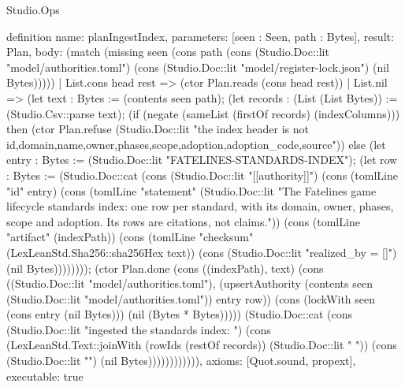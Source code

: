 \begin{lexlean}{Studio.Ops}
\begin{semanticmodule}
definition{
  name: planIngestIndex,
  parameters: [seen : Seen, path : Bytes],
  result: Plan,
  body: (match (missing seen (cons path (cons (Studio.Doc::lit "model/authorities.toml") (cons (Studio.Doc::lit "model/register-lock.json") (nil Bytes)))))
    | List.cons head rest => (ctor Plan.reads (cons head rest))
    | List.nil => (let text : Bytes := (contents seen path); (let records : (List (List Bytes)) := (Studio.Csv::parse text); (if (negate (sameList (firstOf records) (indexColumns))) then (ctor Plan.refuse (Studio.Doc::lit "the index header is not id,domain,name,owner,phases,scope,adoption,adoption_code,source\n")) else (let entry : Bytes := (Studio.Doc::lit "FATELINES-STANDARDS-INDEX"); (let row : Bytes := (Studio.Doc::cat (cons (Studio.Doc::lit "[[authority]]\n") (cons (tomlLine "id" entry) (cons (tomlLine "statement" (Studio.Doc::lit "The Fatelines game lifecycle standards index: one row per standard, with its domain, owner, phases, scope and adoption. Its rows are citations, not claims.")) (cons (tomlLine "artifact" (indexPath)) (cons (tomlLine "checksum" (LexLeanStd.Sha256::sha256Hex text)) (cons (Studio.Doc::lit "realized_by = []\n") (nil Bytes)))))))); (ctor Plan.done (cons ((indexPath), text) (cons ((Studio.Doc::lit "model/authorities.toml"), (upsertAuthority (contents seen (Studio.Doc::lit "model/authorities.toml")) entry row)) (cons (lockWith seen (cons entry (nil Bytes))) (nil (Bytes * Bytes))))) (Studio.Doc::cat (cons (Studio.Doc::lit "ingested the standards index: ") (cons (LexLeanStd.Text::joinWith (rowIds (restOf records)) (Studio.Doc::lit " ")) (cons (Studio.Doc::lit "\n") (nil Bytes)))))))))))),
  axioms: [Quot.sound, propext],
  executable: true
}



\end{semanticmodule}
\end{lexlean}
